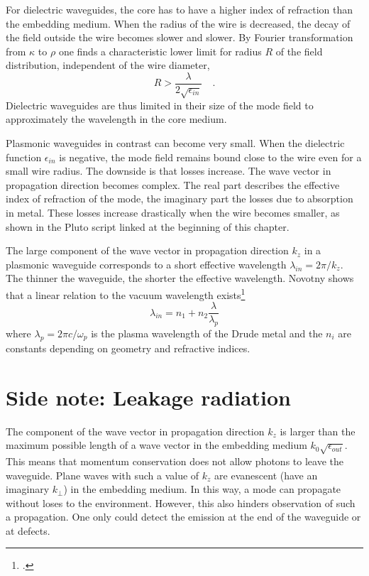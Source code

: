 For dielectric waveguides, the core has to have a higher index of refraction than the embedding medium. When the radius of the wire is decreased, the decay of the field outside the wire becomes slower and slower.  By Fourier transformation from $\kappa$ to $\rho$ one finds a characteristic lower limit for radius $R$ of the field distribution, independent of the wire diameter,
\begin{equation}
  R > \frac{\lambda}{2 \sqrt{\epsilon_{in}}} \quad .
\end{equation}
Dielectric waveguides are thus limited in their size of the mode field to approximately the wavelength in the core medium.

Plasmonic waveguides in contrast can become very small. When the dielectric function $\epsilon_{in}$ is negative, the mode field remains bound close to the wire even for a small  wire radius. The downside is that losses increase. The wave vector in propagation direction becomes complex. The real part describes the effective index of refraction of the mode, the imaginary part the losses due to absorption in metal. These losses increase drastically when the wire becomes smaller, as shown in the Pluto script linked at the beginning of this chapter.

The large component of the wave vector in propagation direction $k_z$ in a plasmonic waveguide corresponds to a short effective wavelength $\lambda_{in} = 2 \pi / k_z$. The thinner the waveguide, the shorter the effective wavelength. Novotny shows that  a linear relation to the vacuum wavelength exists\footcite{Novotny07}
\begin{equation}
  \lambda_{in} = n_1 + n_2 \frac{\lambda}{\lambda_{p}}
\end{equation}
where $\lambda_p = 2 \pi c / \omega_p$ is the plasma wavelength of the Drude metal and the $n_i$ are constants depending on geometry and refractive indices.


\section{Side note: Leakage radiation}

The component of the wave vector in propagation direction $k_z$ is larger than the maximum possible length of a wave vector in the embedding medium $k_0 \sqrt{\epsilon_{out}}$. This means that momentum conservation does not allow photons to leave the waveguide. Plane waves with such a value of $k_z$ are evanescent (have an imaginary $k_\perp$) in the embedding medium. In this way, a mode can propagate without loses to the environment. However, this also hinders observation of such a propagation. One only could detect the emission at the end of the waveguide or at defects.

